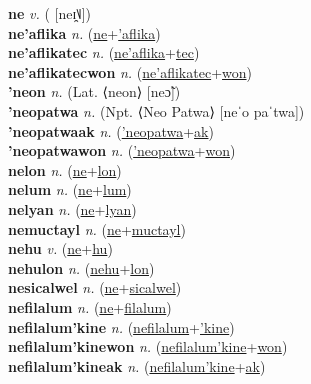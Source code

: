 \textbf{ne} \textit{v.} ( [neɪ̯˥˩])
 \label{ne} \\
\textbf{ne'aflika} \textit{n.} (\hyperref[ne]{ne}+\hyperref['aflika]{'aflika})
 \label{ne'aflika} \\
\textbf{ne'aflikatec} \textit{n.} (\hyperref[ne'aflika]{ne'aflika}+\hyperref[tec]{tec})
 \label{ne'aflikatec} \\
\textbf{ne'aflikatecwon} \textit{n.} (\hyperref[ne'aflikatec]{ne'aflikatec}+\hyperref[won]{won})
 \label{ne'aflikatecwon} \\
\textbf{'neon} \textit{n.} (Lat. ⟨neon⟩ [neɔ̃])
 \label{'neon} \\
\textbf{'neopatwa} \textit{n.} (Npt. ⟨Neo Patwa⟩ [neˈo paˈtwa])
 \label{'neopatwa} \\
\textbf{'neopatwaak} \textit{n.} (\hyperref['neopatwa]{'neopatwa}+\hyperref[ak]{ak})
 \label{'neopatwaak} \\
\textbf{'neopatwawon} \textit{n.} (\hyperref['neopatwa]{'neopatwa}+\hyperref[won]{won})
 \label{'neopatwawon} \\
\textbf{nelon} \textit{n.} (\hyperref[ne]{ne}+\hyperref[lon]{lon})
 \label{nelon} \\
\textbf{nelum} \textit{n.} (\hyperref[ne]{ne}+\hyperref[lum]{lum})
 \label{nelum} \\
\textbf{nelyan} \textit{n.} (\hyperref[ne]{ne}+\hyperref[lyan]{lyan})
 \label{nelyan} \\
\textbf{nemuctayl} \textit{n.} (\hyperref[ne]{ne}+\hyperref[muctayl]{muctayl})
 \label{nemuctayl} \\
\textbf{nehu} \textit{v.} (\hyperref[ne]{ne}+\hyperref[hu]{hu})
 \label{nehu} \\
\textbf{nehulon} \textit{n.} (\hyperref[nehu]{nehu}+\hyperref[lon]{lon})
 \label{nehulon} \\
\textbf{nesicalwel} \textit{n.} (\hyperref[ne]{ne}+\hyperref[sicalwel]{sicalwel})
 \label{nesicalwel} \\
\textbf{nefilalum} \textit{n.} (\hyperref[ne]{ne}+\hyperref[filalum]{filalum})
 \label{nefilalum} \\
\textbf{nefilalum'kine} \textit{n.} (\hyperref[nefilalum]{nefilalum}+\hyperref['kine]{'kine})
 \label{nefilalum'kine} \\
\textbf{nefilalum'kinewon} \textit{n.} (\hyperref[nefilalum'kine]{nefilalum'kine}+\hyperref[won]{won})
 \label{nefilalum'kinewon} \\
\textbf{nefilalum'kineak} \textit{n.} (\hyperref[nefilalum'kine]{nefilalum'kine}+\hyperref[ak]{ak})
 \label{nefilalum'kineak} \\

